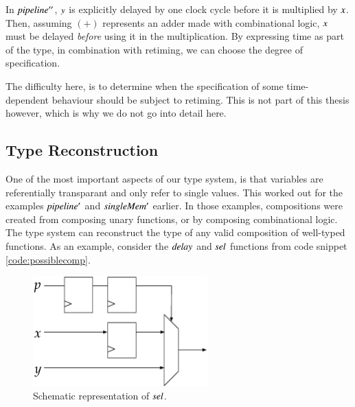 In \ensuremath{\Varid{pipeline''}}, \ensuremath{\Varid{y}} is explicitly delayed by one clock cycle before it is multiplied by \ensuremath{\Varid{x}}.
Then, assuming \ensuremath{(\mathbin{+})} represents an adder made with combinational logic, \ensuremath{\Varid{x}} must be delayed \textit{before} using it in the multiplication.
By expressing time as part of the type, in combination with retiming, we can choose the degree of specification.

The difficulty here, is to determine when the specification of some time-dependent behaviour should be subject to retiming.
This is not part of this thesis however, which is why we do not go into detail here.

\subsection{Type Reconstruction}
One of the most important aspects of our type system, is that variables are referentially transparant and only refer to single values.
This worked out for the examples \ensuremath{\Varid{pipeline'}} and \ensuremath{\Varid{singleMem'}} earlier.
In those examples, compositions were created from composing unary functions, or by composing combinational logic.
The type system can reconstruct the type of any valid composition of well-typed functions.
As an example, consider the \ensuremath{\Varid{delay}} and \ensuremath{\Varid{sel}} functions from code snippet \ref{code:possiblecomp}.

\begin{figure}[H]
\begin{center}
\centering
\includegraphics[width=0.6\textwidth]{images/sel}
\end{center}
\caption{Schematic representation of \ensuremath{\Varid{sel}}.} \label{fig:sel}
\end{figure}

